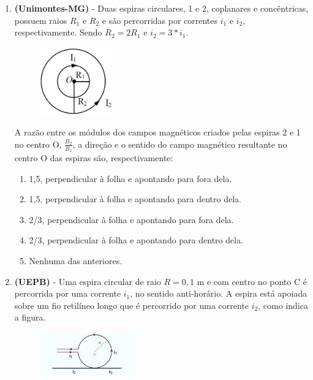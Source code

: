 \documentclass[12pt,letterpaper,fleqn]{article}
\begin{document}
\begin{itemize}
\begin{enumerate}
             \item \textbf{(Unimontes-MG)} -  Duas espiras circulares, 1 e 2, coplanares e concêntricas, possuem raios $R_1$ e $R_2$ e são percorridas por correntes $i_1$ e $i_2$, respectivamente. Sendo $R_2 = 2R_1$ e $i_2 = 3*i_1$. 
             \begin{figure}[h]
                 \centering
                 \includegraphics[width=0.3\textwidth]{ex_10.jpg}
             \end{figure}
             
             A razão entre os módulos dos campos magnéticos criados pelas espiras 2 e 1 no centro O, $\frac{B_2}{B_1}$, a direção e o sentido do campo magnético resultante no centro O das espiras são, respectivamente:
             
             \begin{enumerate}
                 \item 1,5, perpendicular à folha e apontando para fora dela.
                 \item 1,5, perpendicular à folha e apontando para dentro dela.
                 \item 2/3, perpendicular à folha e apontando para fora dela.
                 \item 2/3, perpendicular à folha e apontando para dentro dela.
                 \item Nenhuma das anteriores.
             \end{enumerate}
             
             \item \textbf{(UEPB)} - Uma espira circular de raio $R=0,1$ m e com centro no ponto C é percorrida por uma corrente $i_1$, no sentido anti-horário. A espira está apoiada sobre um fio retilíneo longo que é percorrido por uma corrente $i_2$, como indica a figura.
             
             \begin{figure}[h]
                 \centering
                 \includegraphics[width=0.4\textwidth]{ex_11.jpg}
             \end{figure}
             

\end{enumerate}
\end{itemize}
\end{document}
